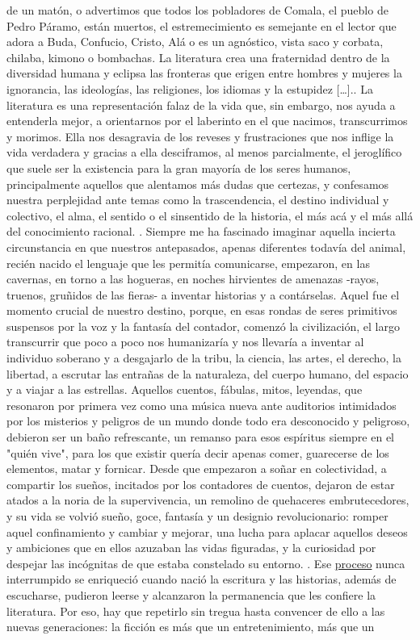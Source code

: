 \documentclass[a4paper,12pt]{article}
\begin{document}
de un matón, o advertimos que todos los pobladores de Comala, el pueblo de Pedro Páramo, están muertos, el estremecimiento es semejante en el lector que adora a Buda, Confucio, Cristo, Alá o es un agnóstico, vista saco y corbata, chilaba, kimono o bombachas. La literatura crea una fraternidad dentro de la diversidad humana y eclipsa las fronteras que erigen entre hombres y mujeres la ignorancia, las ideologías, las religiones, los idiomas y la estupidez […].. La literatura es una representación falaz de la vida que, sin embargo, nos ayuda a entenderla mejor, a orientarnos por el laberinto en el que nacimos, transcurrimos y morimos. Ella nos desagravia de los reveses y frustraciones que nos inflige la vida verdadera y gracias a ella desciframos, al menos parcialmente, el jeroglífico que suele ser la existencia para la gran mayoría de los seres humanos, principalmente aquellos que alentamos más dudas que certezas, y confesamos nuestra perplejidad ante temas como la trascendencia, el destino individual y colectivo, el alma, el sentido o el sinsentido de la historia, el más acá y el más allá del conocimiento racional. . Siempre me ha fascinado imaginar aquella incierta circunstancia en que nuestros antepasados, apenas diferentes todavía del animal, recién nacido el lenguaje que les permitía comunicarse, empezaron, en las cavernas, en torno a las hogueras, en noches hirvientes de amenazas -rayos, truenos, gruñidos de las fieras- a inventar historias y a contárselas. Aquel fue el momento crucial de nuestro destino, porque, en esas rondas de seres primitivos suspensos por la voz y la fantasía del contador, comenzó la civilización, el largo transcurrir que poco a poco nos humanizaría y nos llevaría a inventar al individuo soberano y a desgajarlo de la tribu, la ciencia, las artes, el derecho, la libertad, a escrutar las entrañas de la naturaleza, del cuerpo humano, del espacio y a viajar a las estrellas. Aquellos cuentos, fábulas, mitos, leyendas, que resonaron por primera vez como una música nueva ante auditorios intimidados por los misterios y peligros de un mundo donde todo era desconocido y peligroso, debieron ser un baño refrescante, un remanso para esos espíritus siempre en el "quién vive", para los que existir quería decir apenas comer, guarecerse de los elementos, matar y fornicar. Desde que empezaron a soñar en colectividad, a compartir los sueños, incitados por los contadores de cuentos, dejaron de estar atados a la noria de la supervivencia, un remolino de quehaceres embrutecedores, y su vida se volvió sueño, goce, fantasía y un designio revolucionario: romper aquel confinamiento y cambiar y mejorar, una lucha para aplacar aquellos deseos y ambiciones que en ellos azuzaban las vidas figuradas, y la curiosidad por despejar las incógnitas de que estaba constelado su entorno. . Ese \underline{ proceso} nunca interrumpido se enriqueció cuando nació la escritura y las historias, además de escucharse, pudieron leerse y alcanzaron la permanencia que les confiere la literatura. Por eso, hay que repetirlo sin tregua hasta convencer de ello a las nuevas generaciones: la ficción es más que un entretenimiento, más que un 
\end{document}
